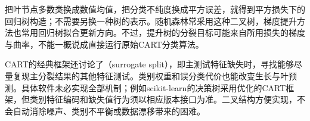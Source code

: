把叶节点多数类换成数值均值，把分类不纯度换成平方误差，就得到平方损失下的回归树构造；不需要另换一种树的表示。随机森林常采用这种二叉树，梯度提升方法也常用回归树拟合更新方向。不过，提升树的分裂目标可能来自所用损失的梯度与曲率，不能一概说成直接运行原始CART分类算法。

CART的经典框架还讨论了（surrogate split），即主测试特征缺失时，寻找能够尽量复现主分裂结果的其他特征测试。类别权重和误分类代价也能改变生长与叶预测。具体软件未必实现全部机制；例如scikit-learn的决策树采用优化的CART框架，但类别特征编码和缺失值行为须以相应版本接口为准。二叉结构方便实现，不会自动消除噪声、类别不平衡或数据漂移带来的困难。
